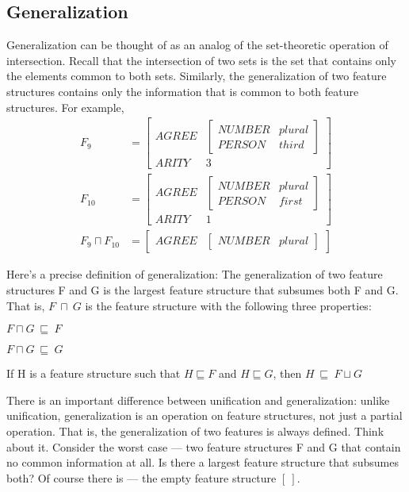 \documentclass{article}
\begin{document}
\begin{CJK}{UTF8}{gbsn}
\subsection{Generalization}

Generalization can be thought of as an analog of the set-theoretic operation of intersection. Recall that the intersection of two sets is the set that contains only the elements common to both sets. Similarly, the generalization of two feature structures contains only the information that is common to both feature structures. For example,
\begin{align*}
F_9 &= 
\begin{bmatrix}
AGREE & 
\begin{bmatrix}
NUMBER & plural \\
PERSON & third
\end{bmatrix} \\
ARITY & 3
\end{bmatrix} \\
F_{10} &=
\begin{bmatrix}
AGREE & 
\begin{bmatrix}
NUMBER & plural \\
PERSON & first
\end{bmatrix} \\
ARITY & 1
\end{bmatrix} \\
F_9 \sqcap F_{10} &= 
\begin{bmatrix}
AGREE & 
\begin{bmatrix}
NUMBER & plural
\end{bmatrix}
\end{bmatrix}
\end{align*}

Here's a precise definition of generalization: The generalization of two feature structures F  and G  is the largest feature structure that subsumes both F  and G. That is, $F\ \sqcap \ G$  is the feature structure with the following three properties: 
\begin{enumerate*}
\item $F\sqcap G\ \sqsubseteq \ F$
\item $F\sqcap G \ \sqsubseteq \ G$
\item If H is a feature structure such that $H\sqsubseteq F$ and $H\sqsubseteq G$, then $H\ \sqsubseteq \ F\sqcup G$
\end{enumerate*}

There is an important difference between unification and generalization: unlike unification, generalization is an operation on feature structures, not just a partial operation. That is, the generalization of two features is always defined. Think about it. Consider the worst case --- two feature structures F  and G  that contain no common information at all. Is there a largest feature structure that subsumes both? Of course there is --- the empty feature structure $[\ ]$. 


\end{CJK}
\end{document}
